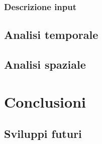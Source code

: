 \documentclass[a4paper,12pt, oneside]{book}
\begin{document}
\subsection{Descrizione input}
\section{Analisi temporale}
\section{Analisi spaziale}
\chapter{Conclusioni}
\section{Sviluppi futuri}
\printbibliography[title={Bibliografia e sitografia}]

\end{document}
